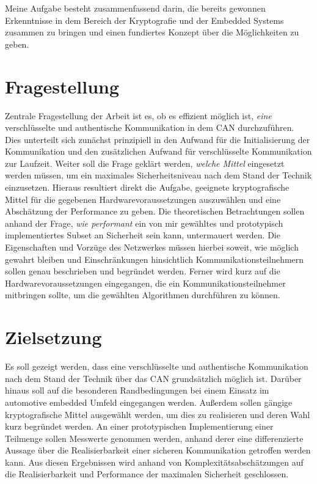 Meine Aufgabe besteht zusammenfassend darin, die bereits gewonnen Erkenntnisse in dem Bereich der Kryptografie und der Embedded Systems zusammen zu bringen und einen fundiertes Konzept über die Möglichkeiten zu geben. 

\section{Fragestellung}
Zentrale Fragestellung der Arbeit ist es, ob es effizient möglich ist, \emph{eine} verschlüsselte und authentische Kommunikation in dem CAN durchzuführen. %
\newline
Dies unterteilt sich zunächst prinzipiell in den Aufwand für die Initialisierung der Kommunikation und den zusätzlichen Aufwand für verschlüsselte Kommunikation zur Laufzeit.
\newline
Weiter soll die Frage geklärt werden, \emph{welche Mittel} eingesetzt werden müssen, um ein maximales Sicherheitsniveau nach dem Stand der Technik einzusetzen. Hieraus resultiert direkt die Aufgabe, geeignete kryptografische Mittel für die gegebenen Hardwarevoraussetzungen auszuwählen und eine Abschätzung der Performance zu geben.
\newline
Die theoretischen Betrachtungen sollen anhand der Frage, \emph{wie performant} ein von mir gewähltes %
und prototypisch implementiertes Subset an Sicherheit sein kann, untermauert werden.
\newline
Die Eigenschaften und Vorzüge des Netzwerkes müssen hierbei soweit, wie möglich gewahrt bleiben und Einschränkungen hinsichtlich Kommunikationsteilnehmern sollen genau beschrieben und begründet werden.
Ferner wird kurz auf die Hardwarevoraussetzungen eingegangen, die ein Kommunikationsteilnehmer mitbringen sollte, um die gewählten Algorithmen durchführen zu können. 

\section{Zielsetzung}
Es soll gezeigt werden, dass eine verschlüsselte und authentische Kommunikation nach dem Stand der Technik über das CAN grundsätzlich möglich ist. Darüber hinaus soll auf die besonderen Randbedingungen bei einem Einsatz im automotive embedded Umfeld eingegangen werden. Außerdem sollen gängige kryptografische Mittel ausgewählt werden, um dies zu realisieren und deren Wahl kurz begründet werden. 
An einer prototypischen Implementierung einer Teilmenge sollen Messwerte genommen werden, anhand derer eine differenzierte Aussage über die Realisierbarkeit einer sicheren Kommunikation getroffen werden kann. Aus diesen Ergebnissen wird anhand von Komplexitätsabschätzungen auf die Realisierbarkeit und Performance der maximalen Sicherheit geschlossen. 

